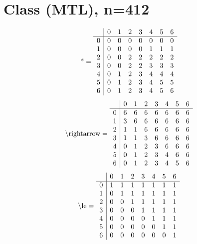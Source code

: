 \documentclass[11pt]{article}
\begin{document}
\section{Class (MTL), n=412}
\[\text{*} = 
\begin{array}{r | r r r r r r r}
 & 0 & 1 & 2 & 3 & 4 & 5 & 6 \\ \hline
0 & 0 & 0 & 0 & 0 & 0 & 0 & 0 \\
1 & 0 & 0 & 0 & 0 & 1 & 1 & 1 \\
2 & 0 & 0 & 2 & 2 & 2 & 2 & 2 \\
3 & 0 & 0 & 2 & 2 & 3 & 3 & 3 \\
4 & 0 & 1 & 2 & 3 & 4 & 4 & 4 \\
5 & 0 & 1 & 2 & 3 & 4 & 5 & 5 \\
6 & 0 & 1 & 2 & 3 & 4 & 5 & 6 \\
\end{array}
\]
\[\text{\textbackslash rightarrow} = 
\begin{array}{r | r r r r r r r}
 & 0 & 1 & 2 & 3 & 4 & 5 & 6 \\ \hline
0 & 6 & 6 & 6 & 6 & 6 & 6 & 6 \\
1 & 3 & 6 & 6 & 6 & 6 & 6 & 6 \\
2 & 1 & 1 & 6 & 6 & 6 & 6 & 6 \\
3 & 1 & 1 & 3 & 6 & 6 & 6 & 6 \\
4 & 0 & 1 & 2 & 3 & 6 & 6 & 6 \\
5 & 0 & 1 & 2 & 3 & 4 & 6 & 6 \\
6 & 0 & 1 & 2 & 3 & 4 & 5 & 6 \\
\end{array}
\]
\[\text{\textbackslash le} = 
\begin{array}{r | r r r r r r r}
 & 0 & 1 & 2 & 3 & 4 & 5 & 6 \\ \hline
0 & 1 & 1 & 1 & 1 & 1 & 1 & 1 \\
1 & 0 & 1 & 1 & 1 & 1 & 1 & 1 \\
2 & 0 & 0 & 1 & 1 & 1 & 1 & 1 \\
3 & 0 & 0 & 0 & 1 & 1 & 1 & 1 \\
4 & 0 & 0 & 0 & 0 & 1 & 1 & 1 \\
5 & 0 & 0 & 0 & 0 & 0 & 1 & 1 \\
6 & 0 & 0 & 0 & 0 & 0 & 0 & 1 \\
\end{array}
\]
\end{document}
